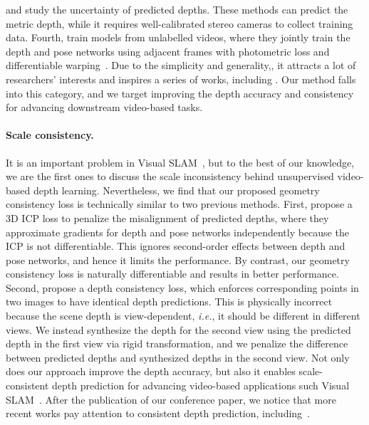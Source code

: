 \documentclass[twocolumn]{svjour3}
\renewcommand{\cite}[1]{\textcolor{blue}{\citep{#1}}}
\def\ie{\emph{i.e.}}
\begin{document}
and \cite{Poggi_CVPR_2020} study the uncertainty of predicted depths.
These methods can predict the metric depth,
while it requires well-calibrated stereo cameras to collect training data.
Fourth, \cite{zhou2017unsupervised} train models from unlabelled videos,
where they jointly train the depth and pose networks using adjacent frames with photometric loss and differentiable warping~\cite{jaderberg2015stn}.
Due to the simplicity and generality,,
it attracts a lot of researchers' interests and inspires a series of works,
including \cite{mahjourian2018unsupervised, Wang2018CVPR, yin2018geonet, zou2018df, ranjan2019cc, monodepth2, chen2019self, gordon2019depth, zhao2020towards, Zhou_2019_ICCV,klingner2020self,packnet,packnet-semguided}.
Our method falls into this category,
and we target improving the depth accuracy and consistency for advancing downstream video-based tasks.


\paragraph{Scale consistency.}
It is an important problem in Visual SLAM~\cite{mur2015orb},
but to the best of our knowledge, 
we are the first ones to discuss the scale inconsistency behind unsupervised video-based depth learning.
Nevertheless, we find that our proposed geometry consistency loss is technically similar to two previous methods.
First, \cite{mahjourian2018unsupervised} propose a 3D ICP loss to penalize the misalignment of predicted depths,
where they approximate gradients for depth and pose networks independently because the ICP is not differentiable.
This ignores second-order effects between depth and pose networks,
and hence it limits the performance.
By contrast, our geometry consistency loss is naturally differentiable and results in better performance.
Second, \cite{zou2018df} propose a depth consistency loss,
which enforces corresponding points in two images to have identical depth predictions.
This is physically incorrect because the scene depth is view-dependent,
\ie, it should be different in different views.
We instead synthesize the depth for the second view using the predicted depth in the first view via rigid transformation,
and we penalize the difference between predicted depths and synthesized depths in the second view.
Not only does our approach improve the depth accuracy, 
but also it enables scale-consistent depth prediction for advancing video-based applications such Visual SLAM~\cite{murORB2}.
After the publication of our conference paper,
we notice that more recent works pay attention to consistent depth prediction,
including~\cite{luo2020consistent,tiwari2020pseudo,zhao2020towards,zou2020learning}.
\end{document}
